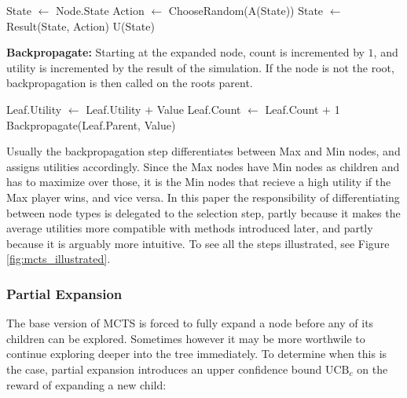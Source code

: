 \begin{algorithm}
    \begin{algorithmic}[1]
            \State State $\gets$ Node.State
                \State Action $\gets$ ChooseRandom(A(State))
                \State State $\gets$ Result(State, Action)
            \EndWhile
            \State \Return U(State)
        \EndProcedure
    \end{algorithmic}    
\end{algorithm}

\textbf{Backpropagate:} Starting at the expanded node, count is 
incremented by $1$, and utility is incremented by the result of
the simulation. If the node is not the root, backpropagation
is then called on the roots parent.

\begin{algorithm}
    \begin{algorithmic}[1]
            \State Leaf.Utility $\gets$ Leaf.Utility $+$ Value
            \State Leaf.Count $\gets$ Leaf.Count $+$ 1
                \State Backpropagate(Leaf.Parent, Value)
            \EndIf
        \EndProcedure
    \end{algorithmic}    
\end{algorithm}

Usually the backpropagation step differentiates between Max and Min nodes, and assigns utilities accordingly. Since the Max nodes have Min nodes as children and has to maximize over those, it is the Min nodes that recieve a high utility if the Max player wins, and vice versa. In this paper the responsibility of differentiating between node types is delegated to the selection step, partly because it makes the average utilities more compatible with methods introduced later, and partly because it is arguably more intuitive. To see all the steps illustrated, see Figure \ref{fig:mcts_illustrated}.



\newpage
\subsubsection{Partial Expansion}
The base version of MCTS is forced to fully expand a node
before any of its children can be explored. Sometimes however
it may be more worthwile to continue exploring deeper into the
tree immediately. To determine when this is the case, partial
expansion \cite{Jacobsen2014, Frydenberg2015} introduces an upper confidence bound $\text{UCB}_c$ on 
the reward of expanding a new child:

